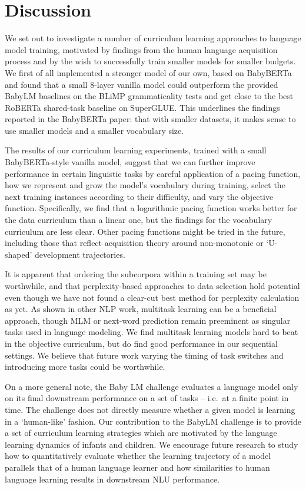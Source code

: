 \section{Discussion}\label{sec:discussion}

We set out to investigate a number of curriculum learning approaches to language model training, motivated by findings from the human language acquisition process and by the wish to successfully train smaller models for smaller budgets.
We first of all implemented a stronger model of our own, based on BabyBERTa \cite{huebner2021babyberta} and found that a small 8-layer vanilla model could outperform the provided BabyLM baselines on the BLiMP grammaticality tests and get close to the best RoBERTa shared-task baseline on SuperGLUE. This underlines the findings reported in the BabyBERTa paper: that with smaller datasets, it makes sense to use smaller models and a smaller vocabulary size.

The results of our curriculum learning experiments, trained with a small BabyBERTa-style vanilla model, suggest that we can further improve performance in certain linguistic tasks by careful application of a pacing function, how we represent and grow the model's vocabulary during training, select the next training instances according to their difficulty, and vary the objective function. Specifically, we find that a logarithmic pacing function works better for the data curriculum than a linear one, but the findings for the vocabulary curriculum are less clear. Other pacing functions might be tried in the future, including those that reflect acquisition theory around non-monotonic or `U-shaped' development trajectories.

It is apparent that ordering the subcorpora within a training set may be worthwhile, and that perplexity-based approaches to data selection hold potential even though we have not found a clear-cut best method for perplexity calculation as yet. As shown in other NLP work, multitask learning can be a beneficial approach, though MLM or next-word prediction remain preeminent as singular tasks used in language modeling. We find multitask learning models hard to beat in the objective curriculum, but do find good performance in our sequential settings. We believe that future work varying the timing of task switches and introducing more tasks could be worthwhile.

On a more general note, the Baby LM challenge evaluates a language model only on its final downstream performance on a set of tasks -- i.e.\ at a finite point in time. The challenge does not directly measure whether a given model is learning in a `human-like' fashion. Our contribution to the BabyLM challenge is to provide a set of curriculum learning strategies which are motivated by the language learning dynamics of infants and children. We encourage future research to study how to quantitatively evaluate whether the learning trajectory of a model parallels that of a human language learner and how similarities to human language learning results in downstream NLU performance. 

